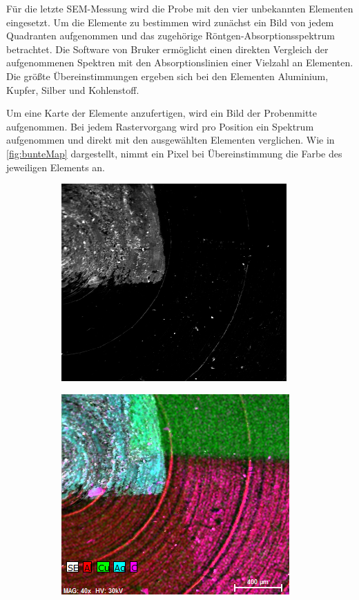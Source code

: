 	Für die letzte SEM-Messung wird die Probe mit den vier unbekannten Elementen eingesetzt.
	Um die Elemente zu bestimmen wird zunächst ein Bild von jedem Quadranten aufgenommen und das zugehörige Röntgen-Absorptionsspektrum betrachtet.
	Die Software von Bruker ermöglicht einen direkten Vergleich der aufgenommenen Spektren mit den Absorptionslinien einer Vielzahl an Elementen.
	Die größte Übereinstimmungen ergeben sich bei den Elementen Aluminium, Kupfer, Silber und Kohlenstoff.

	Um eine Karte der Elemente anzufertigen, wird ein Bild der Probenmitte aufgenommen.
	Bei jedem Rastervorgang wird pro Position ein Spektrum aufgenommen und direkt mit den ausgewählten Elementen verglichen.
	Wie in \cref{fig:bunteMap} dargestellt, nimmt ein Pixel bei Übereinstimmung die Farbe des jeweiligen Elements an.
	\begin{figure}[H]
		\centering
		\begin{subfigure}[c]{.45\textwidth}
			\centering
			\includegraphics[width=.8\textwidth]{raw/SEM/Map4ProbenExt}
			\subcaption{}
			\label{fig:farbloseMap}
		\end{subfigure}
		\begin{subfigure}[c]{.45\textwidth}
			\centering
			\includegraphics[width=.8\textwidth]{raw/SEM/Mapdaten4Proben}

\end{subfigure}
\end{figure}
